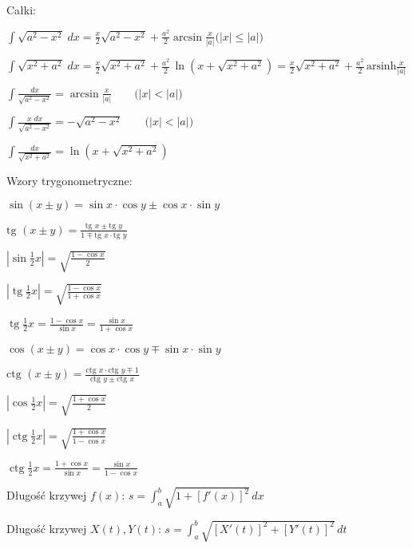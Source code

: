 \documentclass[10pt]{article}
\begin{document}
\parindent 0pt
\setlength{\parskip}{8pt}
\setlength\multicolsep{8pt}

Całki:
 
$\int\sqrt{a^2-x^2}\;dx = \frac{x}{2}\sqrt{a^2-x^2}+\frac{a^2}{2}\arcsin\frac{x}{|a|} \mbox{(}|x|\leq|a|)$
 
$\int\sqrt{x^2+a^2}\;dx 
=\frac{x}{2}\sqrt{x^2+a^2}+\frac{a^2}{2}\,\ln\left(x+\sqrt{x^2+a^2}\right) = \frac{x}{2}\sqrt{x^2+a^2}+\frac{a^2}{2}\,\mathrm{arsinh}\frac{x}{|a|}$
 
$\int\frac{dx}{\sqrt{a^2-x^2}} = \arcsin\frac{x}{|a|} \qquad\mbox{(}|x|<|a|\mbox{)}$
 
$\int\frac{x\;dx}{\sqrt{a^2-x^2}} =-\sqrt{a^2-x^2}\qquad\mbox{(}|x|<|a|\mbox{)}$
 
$\int\frac{dx}{\sqrt{x^2+a^2}} =\ln\left(x+\sqrt{x^2+a^2}\right)$
 
Wzory trygonometryczne:

\begin{multicols}{2}

$\sin (x \pm y) = \sin x \cdot \cos y  \pm \cos x \cdot \sin y$

$\mbox{tg } (x \pm y) = \frac{\mbox{tg } x \pm \mbox{tg } y}{1 \mp \mbox{tg } x \cdot \mbox{tg } y}$

$\left| \sin\frac{1}{2}x \right|=\sqrt{\frac{1-\cos x}{2}}$

$\left| \operatorname{tg}\frac{1}{2}x \right|=\sqrt{\frac{1-\cos x}{1+\cos x}}$

$\operatorname{tg}\frac{1}{2}x =\frac{1-\cos x}{\sin x}=\frac{\sin x}{1+\cos x}$

\columnbreak

$\cos (x \pm y) = \cos x \cdot \cos y  \mp \sin x \cdot \sin y$

$\mbox{ctg } (x \pm y) = \frac{\mbox{ctg } x \cdot \mbox{ctg } y \mp 1}{\mbox{ctg } y \pm \mbox{ctg } x}$ 

$\left| \cos\frac{1}{2}x \right|=\sqrt{\frac{1+\cos x}{2}}$

$\left| \operatorname{ctg}\frac{1}{2}x \right|=\sqrt{\frac{1+\cos x}{1-\cos x}}$

$\operatorname{ctg}\frac{1}{2}x=\frac{1+\cos x}{\sin x}=\frac{\sin x}{1-\cos x}$

\end{multicols}


 
Długość krzywej $f(x)$: $s = \int_{a}^{b} \sqrt { 1 + [f'(x)]^2 }\, dx$
 
Długość krzywej $X(t), Y(t)$: $s = \int_{a}^{b} \sqrt { [X'(t)]^2 + [Y'(t)]^2 }\, dt$
 
\end{document}
